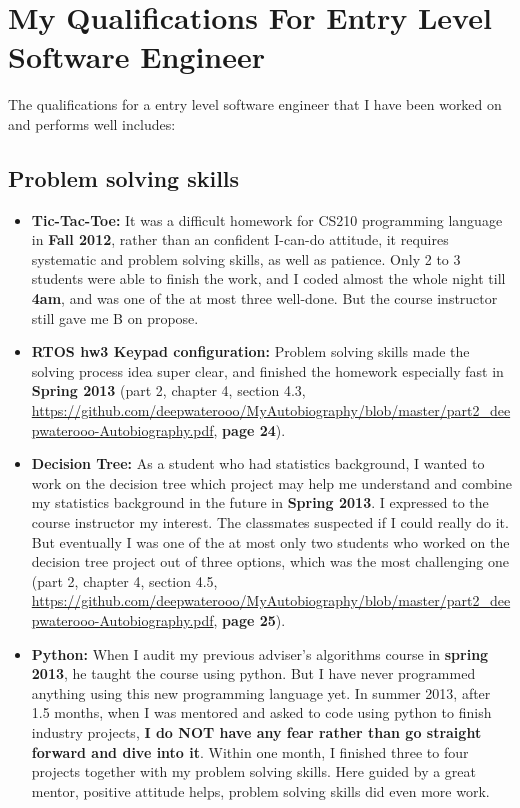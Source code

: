 \documentclass[9pt,b5paper]{article}
\begin{document}
\section{My Qualifications For Entry Level Software Engineer}
\label{sec-9}
The qualifications for a entry level software engineer that I have been worked on and performs well includes: 
\subsection{Problem solving skills}
\label{sec-9-1}
\begin{itemize}
\item \textbf{Tic-Tac-Toe:} It was a difficult homework for CS210 programming language in \textbf{Fall 2012}, rather than an confident I-can-do attitude, it requires systematic and problem solving skills, as well as patience. Only 2 to 3 students were able to finish the work, and I coded almost the whole night till \textbf{4am}, and was one of the at most three well-done. But the course instructor still gave me B on propose.
\item \textbf{RTOS hw3 Keypad configuration:} Problem solving skills made the solving process idea super clear, and finished the homework especially fast in \textbf{Spring 2013} (part 2, chapter 4, section 4.3, \url{https://github.com/deepwaterooo/MyAutobiography/blob/master/part2_deepwaterooo-Autobiography.pdf}, \textbf{page 24}).
\item \textbf{Decision Tree:} As a student who had statistics background, I wanted to work on the decision tree which project may help me understand and combine my statistics background in the future in \textbf{Spring 2013}. I expressed to the course instructor my interest. The classmates suspected if I could really do it. But eventually I was one of the at most only two students who worked on the decision tree project out of three options, which was the most challenging one (part 2, chapter 4, section 4.5, \url{https://github.com/deepwaterooo/MyAutobiography/blob/master/part2_deepwaterooo-Autobiography.pdf}, \textbf{page 25}).
\item \textbf{Python:} When I audit my previous adviser's algorithms course in \textbf{spring 2013}, he taught the course using python. But I have never programmed anything using this new programming language yet. In summer 2013, after 1.5 months, when I was mentored and asked to code using python to finish industry projects, \textbf{I do NOT have any fear rather than go straight forward and dive into it}. Within one month, I finished three to four projects together with my problem solving skills. Here guided by a great mentor, positive attitude helps, problem solving skills did even more work.

\end{itemize}
\end{document}
